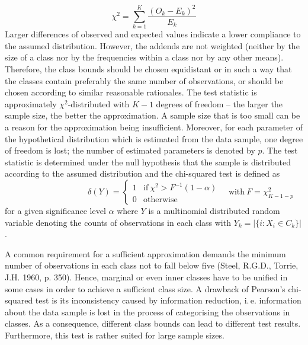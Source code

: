 \documentclass[a4paper, 12pt, titlepage, headsepline, listof = totoc, bibliography = totoc, numbers = noenddot]{scrartcl}
\newcommand{\ie}{i.\,e. }
\begin{document}
\[\chi^2 = \sum_{k=1}^{K}\frac{(O_k - E_k)^2}{E_k}\]
Larger differences of observed and expected values indicate a lower compliance to the assumed distribution. However, the addends are not weighted (neither by the size of a class nor by the frequencies within a class nor by any other means). Therefore, the class bounds should be chosen equidistant or in such a way that the classes contain preferably the same number of observations, or should be chosen according to similar reasonable rationales. The test statistic is approximately $\chi^2$-distributed with $K-1$ degrees of freedom -- the larger the sample size, the better the approximation. A sample size that is too small can be a reason for the approximation being insufficient. Moreover, for each parameter of the hypothetical distribution which is estimated from the data sample, one degree of freedom is lost; the number of estimated parameters is denoted by $p$. The test statistic is determined under the null hypothesis that the sample is distributed according to the assumed distribution and the chi-squared test is defined as
\[
  \phantom{\quad\mbox{with}\ F=\chi^2_{K-1-p}}
  \delta(Y) =
   \left\{ 
    \begin{array}{cll}
                 1 & \mbox{if} \ \chi^2 > F^{-1}(1-\alpha)\\
                 0 & \mbox{otherwise}
    \end{array} 
   \right.
   \quad\mbox{with}\ F=\chi^2_{K-1-p}
\]
for a given significance level $\alpha$ where $Y$ is a multinomial distributed random variable denoting the counts of observations in each class with $Y_k = |\{i : X_i \in C_k\}|$.

A common requirement for a sufficient approximation demands the minimum number 
of observations in each class not to fall below five (Steel, R.G.D., Torrie, J.H. 1960, p. 350). 
Hence, marginal or even inner classes have to be unified in some cases in order to achieve a 
sufficient class size. 
A drawback of Pearson's chi-squared test is its inconsistency caused by information reduction, \ie information about the data sample is lost in the process of categorising the observations in classes. As a consequence, different class bounds can lead to different test results. Furthermore, this test is rather suited for large sample sizes.
\end{document}
